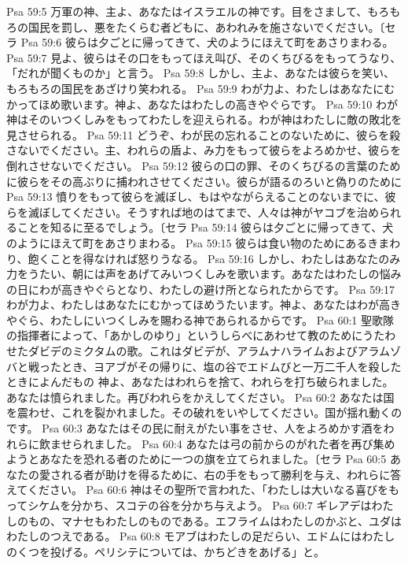 Psa 59:5  万軍の神、主よ、あなたはイスラエルの神です。目をさまして、もろもろの国民を罰し、悪をたくらむ者どもに、あわれみを施さないでください。〔セラ
Psa 59:6  彼らは夕ごとに帰ってきて、犬のようにほえて町をあさりまわる。
Psa 59:7  見よ、彼らはその口をもってほえ叫び、そのくちびるをもってうなり、「だれが聞くものか」と言う。
Psa 59:8  しかし、主よ、あなたは彼らを笑い、もろもろの国民をあざけり笑われる。
Psa 59:9  わが力よ、わたしはあなたにむかってほめ歌います。神よ、あなたはわたしの高きやぐらです。
Psa 59:10  わが神はそのいつくしみをもってわたしを迎えられる。わが神はわたしに敵の敗北を見させられる。
Psa 59:11  どうぞ、わが民の忘れることのないために、彼らを殺さないでください。主、われらの盾よ、み力をもって彼らをよろめかせ、彼らを倒れさせないでください。
Psa 59:12  彼らの口の罪、そのくちびるの言葉のために彼らをその高ぶりに捕われさせてください。彼らが語るのろいと偽りのために
Psa 59:13  憤りをもって彼らを滅ぼし、もはやながらえることのないまでに、彼らを滅ぼしてください。そうすれば地のはてまで、人々は神がヤコブを治められることを知るに至るでしょう。〔セラ
Psa 59:14  彼らは夕ごとに帰ってきて、犬のようにほえて町をあさりまわる。
Psa 59:15  彼らは食い物のためにあるきまわり、飽くことを得なければ怒りうなる。
Psa 59:16  しかし、わたしはあなたのみ力をうたい、朝には声をあげてみいつくしみを歌います。あなたはわたしの悩みの日にわが高きやぐらとなり、わたしの避け所となられたからです。
Psa 59:17  わが力よ、わたしはあなたにむかってほめうたいます。神よ、あなたはわが高きやぐら、わたしにいつくしみを賜わる神であられるからです。
Psa 60:1  聖歌隊の指揮者によって、「あかしのゆり」というしらべにあわせて教のためにうたわせたダビデのミクタムの歌。これはダビデが、アラムナハライムおよびアラムゾバと戦ったとき、ヨアブがその帰りに、塩の谷でエドムびと一万二千人を殺したときによんだもの 神よ、あなたはわれらを捨て、われらを打ち破られました。あなたは憤られました。再びわれらをかえしてください。
Psa 60:2  あなたは国を震わせ、これを裂かれました。その破れをいやしてください。国が揺れ動くのです。
Psa 60:3  あなたはその民に耐えがたい事をさせ、人をよろめかす酒をわれらに飲ませられました。
Psa 60:4  あなたは弓の前からのがれた者を再び集めようとあなたを恐れる者のために一つの旗を立てられました。〔セラ
Psa 60:5  あなたの愛される者が助けを得るために、右の手をもって勝利を与え、われらに答えてください。
Psa 60:6  神はその聖所で言われた、「わたしは大いなる喜びをもってシケムを分かち、スコテの谷を分かち与えよう。
Psa 60:7  ギレアデはわたしのもの、マナセもわたしのものである。エフライムはわたしのかぶと、ユダはわたしのつえである。
Psa 60:8  モアブはわたしの足だらい、エドムにはわたしのくつを投げる。ペリシテについては、かちどきをあげる」と。
